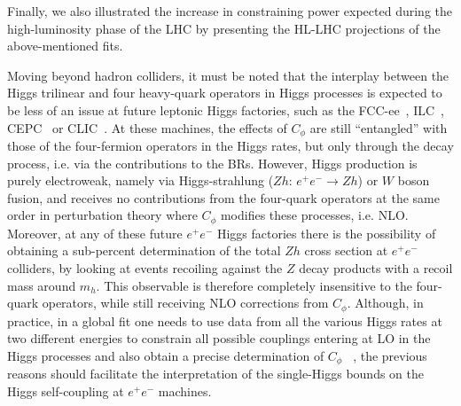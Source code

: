 Finally, we also illustrated the increase in constraining power expected during the high-luminosity phase of the LHC by presenting the HL-LHC projections of the above-mentioned fits.  

Moving beyond hadron colliders, it must be noted that the interplay between the Higgs trilinear and four heavy-quark operators in Higgs processes is expected to be less of an issue at future leptonic Higgs factories, such as the FCC-ee~\cite{FCC:2018byv,FCC:2018evy}, ILC~\cite{Bambade:2019fyw,LCCPhysicsWorkingGroup:2019fvj}, CEPC~\cite{An:2018dwb,CEPCStudyGroup:2018ghi} or CLIC~\cite{CLICdp:2018cto,deBlas:2018mhx}. At these machines, the effects of $C_\phi$ are still ``entangled'' with those
of the four-fermion operators in the Higgs rates, but only through the decay process, i.e. via the contributions to the BRs. However, Higgs production is purely electroweak, namely via Higgs-strahlung ($Zh$: $e^+ e^- \to Zh$) or $W$ boson fusion, and receives no contributions from the four-quark operators at the same order in perturbation theory where $C_\phi$ modifies these processes, i.e. NLO. 
Moreover, at any of these future $e^+ e^-$ Higgs factories there is the possibility of obtaining a sub-percent determination of the total $Zh$ cross section at $e^+ e^-$ colliders, by looking at events recoiling against the $Z$ decay products with a recoil mass around $m_h$. This observable is therefore completely insensitive to the four-quark operators, while still receiving NLO corrections from $C_\phi$. 
Although, in practice, in a global fit one needs to use data from all the various Higgs rates at two different energies to constrain all possible couplings entering at LO in the Higgs processes and also obtain a precise determination of $C_\phi$ ~\cite{DiVita:2017vrr}, the previous reasons should facilitate the interpretation of the single-Higgs bounds on the Higgs self-coupling at $e^+e^-$ machines.

